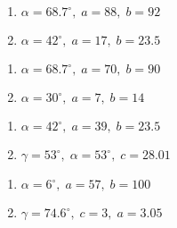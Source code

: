 \documentclass{ximera}
\begin{document}
\begin{multicols}{2} 

\begin{enumerate}

\setcounter{enumi}{\value{HW}}

\item $\alpha = 68.7^{\circ}, \; a = 88, \; b = 92$
\item $\alpha = 42^{\circ}, \; a = 17, \; b = 23.5$

\setcounter{HW}{\value{enumi}}

\end{enumerate}

\end{multicols}

\begin{multicols}{2} 

\begin{enumerate}

\setcounter{enumi}{\value{HW}}

\item $\alpha = 68.7^{\circ}, \; a = 70, \; b = 90$
\item $\alpha = 30^{\circ}, \; a = 7, \; b = 14$

\setcounter{HW}{\value{enumi}}

\end{enumerate}

\end{multicols}

\begin{multicols}{2} 

\begin{enumerate}

\setcounter{enumi}{\value{HW}}

\item $\alpha = 42^{\circ}, \; a = 39, \; b = 23.5$
\item $\gamma = 53^{\circ}, \; \alpha = 53^{\circ}, \; c = 28.01$ \label{secondarea}

\setcounter{HW}{\value{enumi}}

\end{enumerate}

\end{multicols}

\begin{multicols}{2} 

\begin{enumerate}

\setcounter{enumi}{\value{HW}}

\item $\alpha = 6^{\circ}, \; a = 57, \; b = 100$
\item $\gamma = 74.6^{\circ}, \; c = 3, \; a = 3.05$

\setcounter{HW}{\value{enumi}}

\end{enumerate}

\end{multicols}
\end{document}
